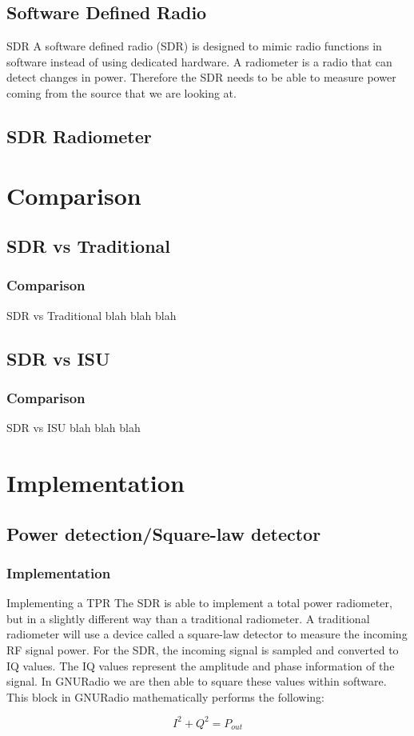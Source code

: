 \documentclass{beamer}
\begin{document}
\subsection{Software Defined Radio}
\begin{frame}
\begin{block}{SDR}
A software defined radio (SDR) is designed to mimic radio functions in software instead of using dedicated hardware.  A radiometer is a radio that can detect changes in power.  Therefore the SDR needs to be able to measure power coming from the source that we are looking at. 
\end{block}
\end{frame}
\subsection{SDR Radiometer}
\section{Comparison}
\subsection{SDR vs Traditional}
\begin{frame}
\frametitle{Comparison}
\begin{block}{SDR vs Traditional}
blah blah blah
\end{block}
\end{frame}
\subsection{SDR vs ISU}
\begin{frame}
\frametitle{Comparison}
\begin{block}{SDR vs ISU}
blah blah blah
\end{block}
\end{frame}
\section{Implementation}
\subsection{Power detection/Square-law detector}
\begin{frame}
\frametitle{Implementation}
\begin{block}{Implementing a TPR}
The SDR is able to implement a total power radiometer, but in a slightly different way than a traditional radiometer.  A traditional radiometer will use a device called a square-law detector to measure the incoming RF signal power.  For the SDR, the incoming signal is sampled and converted to IQ values.  The IQ values represent the amplitude and phase information of the signal.  In GNURadio we are then able to square these values within software.  This block in GNURadio mathematically performs the following:

\begin{equation}
I^2+Q^2 = P_{out}
\end{equation}
\end{block}
\end{frame}
\end{document}
